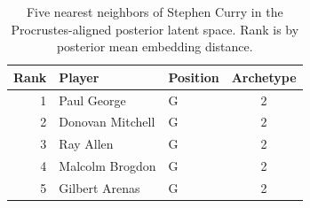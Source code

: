 \begin{table}[htbp]
  \centering\small
  \begin{tabular}{rllc}
    \toprule
    Rank & Player & Position & Archetype \\
    \midrule
    1 & Paul George & G & 2 \\
    2 & Donovan Mitchell & G & 2 \\
    3 & Ray Allen & G & 2 \\
    4 & Malcolm Brogdon & G & 2 \\
    5 & Gilbert Arenas & G & 2 \\
    \bottomrule
  \end{tabular}
  \caption{Five nearest neighbors of Stephen Curry in the Procrustes-aligned posterior latent space. Rank is by posterior mean embedding distance.}
  \label{tab:Stephen_Curry_neighbors}
\end{table}

